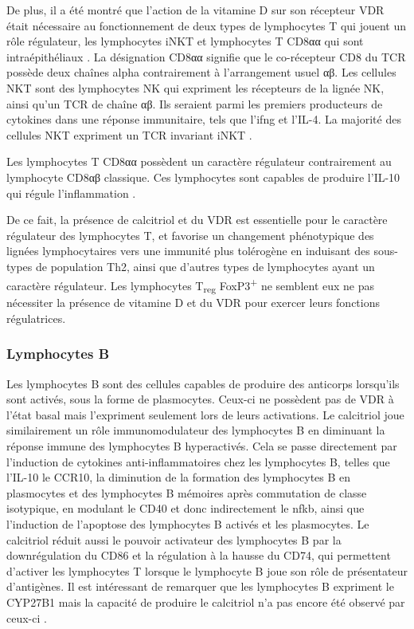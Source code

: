 \documentclass[
  a4paper,
  DIV=11,
  numbers=noendperiod,
  listof=totoc]{scrreprt}
\begin{document}
De plus, il a été montré que l'action de la vitamine D sur son récepteur
VDR était nécessaire au fonctionnement de deux types de lymphocytes T
qui jouent un rôle régulateur, les lymphocytes \ac{iNKT} et lymphocytes
T CD8αα qui sont intraépithéliaux \autocite{Cheroutre.2008}. La
désignation CD8αα signifie que le co-récepteur CD8 du \ac{TCR} possède
deux chaînes alpha contrairement à l'arrangement usuel αβ. Les cellules
NKT sont des lymphocytes NK qui expriment les récepteurs de la lignée
NK, ainsi qu'un \ac{TCR} de chaîne αβ. Ils seraient parmi les premiers
producteurs de cytokines dans une réponse immunitaire, tels que
l'\ac{ifng} et l'\ac{IL-4}. La majorité des cellules NKT expriment un
TCR invariant \acs{iNKT} \autocite{Cantorna.2010}.

Les lymphocytes T CD8αα possèdent un caractère régulateur contrairement
au lymphocyte CD8αβ classique. Ces lymphocytes sont capables de produire
l'\ac{IL-10} qui régule l'inflammation \autocite{Cantorna.2010}.

De ce fait, la présence de calcitriol et du \ac{VDR} est essentielle
pour le caractère régulateur des lymphocytes T, et favorise un
changement phénotypique des lignées lymphocytaires vers une immunité
plus tolérogène en induisant des sous-types de population Th2, ainsi que
d'autres types de lymphocytes ayant un caractère régulateur. Les
lymphocytes T\textsubscript{reg} FoxP3\textsuperscript{+} ne semblent
eux ne pas nécessiter la présence de vitamine D et du \ac{VDR} pour
exercer leurs fonctions régulatrices.

\hypertarget{lymphocytes-b}{%
\subsubsection{Lymphocytes B}\label{lymphocytes-b}}

Les lymphocytes B sont des cellules capables de produire des anticorps
lorsqu'ils sont activés, sous la forme de plasmocytes. Ceux-ci ne
possèdent pas de VDR à l'état basal mais l'expriment seulement lors de
leurs activations. Le calcitriol joue similairement un rôle
immunomodulateur des lymphocytes B en diminuant la réponse immune des
lymphocytes B hyperactivés. Cela se passe directement par l'induction de
cytokines anti-inflammatoires chez les lymphocytes B, telles que
l'\ac{IL-10} le \ac{CCR10}, la diminution de la formation des
lymphocytes B en plasmocytes et des lymphocytes B mémoires après
commutation de classe isotypique, en modulant le CD40 et donc
indirectement le \ac{nfkb}, ainsi que l'induction de l'apoptose des
lymphocytes B activés et les plasmocytes. Le calcitriol réduit aussi le
pouvoir activateur des lymphocytes B par la downrégulation du CD86 et la
régulation à la hausse du CD74, qui permettent d'activer les lymphocytes
T lorsque le lymphocyte B joue son rôle de présentateur d'antigènes. Il
est intéressant de remarquer que les lymphocytes B expriment le
\ac{CYP27B1} mais la capacité de produire le calcitriol n'a pas encore
été observé par ceux-ci \autocite{Meza-Meza.2022,Martens.2020}.
\end{document}
